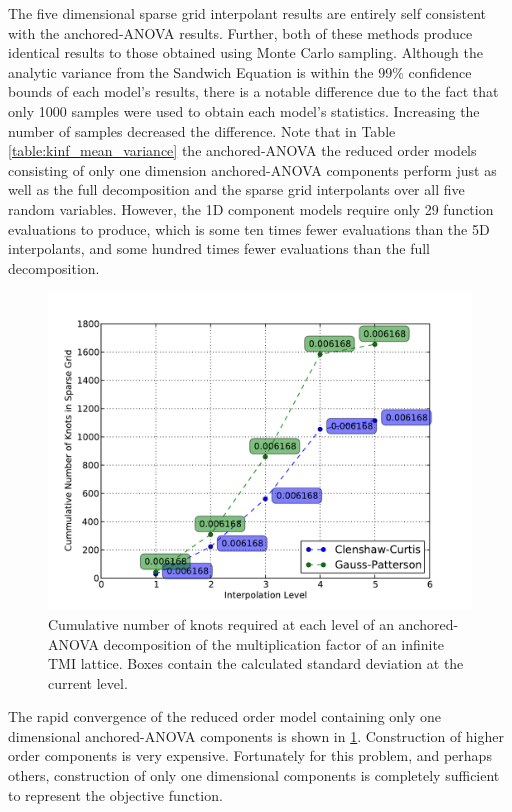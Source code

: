 The five dimensional sparse grid interpolant results are entirely self consistent with the anchored-\ac{ANOVA} results. Further, both of these methods produce identical results to those obtained using Monte Carlo sampling. Although the analytic variance from the Sandwich Equation is within the 99\% confidence bounds of each model's results, there is a notable difference due to the fact that only 1000 samples were used to obtain each model's statistics. Increasing the number of samples decreased the difference. Note that in Table \ref{table:kinf_mean_variance} the anchored-\ac{ANOVA} the reduced order models consisting of only one dimension anchored-\ac{ANOVA} components perform just as well as the full decomposition and the sparse grid interpolants over all five random variables. However, the 1D component models require only 29 function evaluations to produce, which is some ten times fewer evaluations than the 5D interpolants, and some hundred times fewer evaluations than the full decomposition. 
\begin{figure}
\caption[Cumulative knot count for constructing an anchored-\ac{ANOVA} decomposition.]{ \label{fig:kinf_numknots}
Cumulative number of knots required at each level of an anchored-\ac{ANOVA} decomposition of the multiplication factor of an infinite TMI lattice. Boxes contain the calculated standard deviation at the current level.}
 \begin{center}
  \includegraphics[scale=.75]{./Chapter3/kinf_sparse_grid_numknots.pdf}
 \end{center}
\end{figure}
The rapid convergence of the reduced order model containing only one dimensional anchored-\ac{ANOVA} components is shown in \ref{fig:kinf_numknots}. Construction of higher order components is very expensive. Fortunately for this problem, and perhaps others, construction of only one dimensional components is completely sufficient to represent the objective function. 

